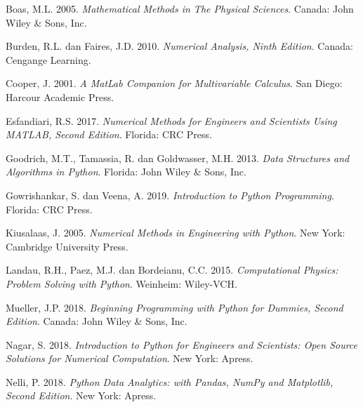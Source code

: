 \begin{thebibliography}{99}
		\pagestyle{empty} %
		\pagestyle{fancy} %

		 Boas, M.L. 2005. \textit{Mathematical Methods in The Physical Sciences}. Canada: John Wiley \& Sons, Inc. 	%

		 Burden, R.L. dan Faires, J.D. 2010. \textit{Numerical Analysis, Ninth Edition}. Canada: Cengange Learning. %

		 Cooper, J. 2001. \textit{A MatLab Companion for Multivariable Calculus}. San Diego: Harcour Academic Press. 

		 Esfandiari, R.S. 2017. \textit{Numerical Methods for Engineers and Scientists Using MATLAB, Second Edition}. Florida: CRC Press.

		 Goodrich, M.T., Tamassia, R. dan Goldwasser, M.H. 2013. \textit{Data Structures and Algorithms in Python}. Florida: John Wiley \& Sons, Inc.

		 Gowrishankar, S. dan Veena, A. 2019. \textit{Introduction to Python Programming}. Florida: CRC Press. 

		 Kiusalaas, J. 2005. \textit{Numerical Methods in Engineering with Python}. New York: Cambridge University Press.

		 Landau, R.H., Paez, M.J. dan Bordeianu, C.C. 2015. \textit{Computational Physics: Problem Solving with Python}. Weinheim: Wiley-VCH.%

		 Mueller, J.P. 2018. \textit{Beginning Programming with Python for Dummies, Second Edition}. Canada: John Wiley \& Sons, Inc.

		 Nagar, S. 2018. \textit{Introduction to Python for Engineers and Scientists: Open Source Solutions for Numerical Computation}. New York: Apress. %

		 Nelli, P. 2018. \textit{Python Data Analytics: with Pandas, NumPy and Matplotlib, Second Edition}. New York: Apress. 


\end{thebibliography}
